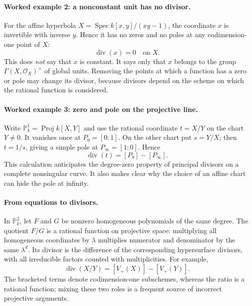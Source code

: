 \paragraph{Worked example 2: a nonconstant unit has no divisor.}
For the affine hyperbola
$X=\operatorname{Spec}k[x,y]/(xy-1)$, the coordinate $x$ is
invertible with inverse $y$.  Hence it has no zeros and no poles
at any codimension-one point of $X$:
\[
 \operatorname{div}(x)=0\quad\text{on }X.
\]
This does \emph{not} say that $x$ is constant.  It says only that
$x$ belongs to the group $\Gamma(X,\mathcal O_X)^\times$ of global
units.  Removing the points at which a function has a zero or pole
may change its divisor, because divisors depend on the scheme on
which the rational function is considered.

\paragraph{Worked example 3: zero and pole on the projective line.}
Write $\mathbb P_k^1=\operatorname{Proj}k[X,Y]$ and use the
rational coordinate $t=X/Y$ on the chart $Y\ne0$.  It vanishes
once at $P_0=[0:1]$.  On the other chart put $s=Y/X$;
then $t=1/s$, giving a simple pole at $P_\infty=[1:0]$.
Hence
\[
 \operatorname{div}(t)=[P_0]-[P_\infty].
\]
This calculation anticipates the degree-zero property of principal
divisors on a complete nonsingular curve.  It also makes clear why
the choice of an affine chart can hide the pole at infinity.

\paragraph{From equations to divisors.}
In $\mathbb P_k^2$, let $F$ and $G$ be nonzero homogeneous
polynomials of the same degree.  The quotient $F/G$ is a rational
function on projective space: multiplying all homogeneous coordinates
by $\lambda$ multiplies numerator and denominator by the same
$\lambda^d$.  Its divisor is the difference of the corresponding
hypersurface divisors, with all irreducible factors counted with
multiplicities.  For example,
\[
 \operatorname{div}(X/Y)=[V_+(X)]-[V_+(Y)].
\]
The bracketed terms denote codimension-one subschemes, whereas
the ratio is a rational function; mixing these two roles is a frequent
source of incorrect projective arguments.

